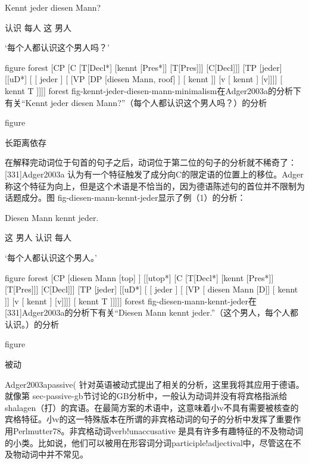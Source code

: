 Kennt jeder diesen Mann?

     认识 每人 这 男人

`每个人都认识这个男人吗？'



figure
forest
[CP
    [C
      [T[Decl*]
        [kennt [Pres*]]
        [T[Pres]]]
      [C[Decl]]]
    [TP
      [jeder]
      [[uD*]
        [
          [ jeder ]
          [
            [VP
              [DP [diesen Mann, roof] ]
              [ kennt ]]
            [v
              [ kennt ]
              [v]]]]
        [ kennt T ]]]]
forest
fig-kennt-jeder-diesen-mann-minimalism在Adger2003a的分析下有关“Kennt jeder diesen Mann?”（每个人都认识这个男人吗？）的分析


figure

长距离依存


在解释完动词位于句首的句子之后，动词位于第二位的句子的分析就不稀奇了：[331]Adger2003a 认为有一个特征触发了成分向C的限定语的位置上的移位。Adger称这个特征为向上，但是这个术语是不恰当的，因为德语陈述句的首位并不限制为话题成分。图 fig-diesen-mann-kennt-jeder显示了例（1）的分析：






Diesen Mann kennt jeder.

     这 男人    认识 每人

`每个人都认识这个男人。'



figure
forest
[CP
  [diesen Mann [top] ]
  [[utop*]
    [C
      [T[Decl*]
        [kennt [Pres*]]
        [T[Pres]]]
      [C[Decl]]]
    [TP
      [jeder]
      [[uD*]
        [
          [ jeder ]
          [
            [VP
              [ diesen Mann [D]]
              [ kennt ]]
            [v
              [ kennt ]
              [v]]]]
        [ kennt T ]]]]]
forest
fig-diesen-mann-kennt-jeder在[331]Adger2003a的分析下有关“Diesen Mann kennt jeder.”（这个男人，每个人都认识。）的分析


figure

被动


Adger2003apassive( 针对英语被动式提出了相关的分析，这里我将其应用于德语。就像第 sec-passive-gb节讨论的GB分析中，一般认为动词并没有将宾格指派给shalagen（打）的宾语。在最简方案的术语中，这意味着小v不具有需要被核查的宾格特征。小v的这一特殊版本在所谓的非宾格动词的句子的分析中发挥了重要作用Perlmutter78。非宾格动词verb!unaccusative 是具有许多有趣特征的不及物动词的小类。比如说，他们可以被用在形容词分词participle!adjectival中，尽管这在不及物动词中并不常见。









